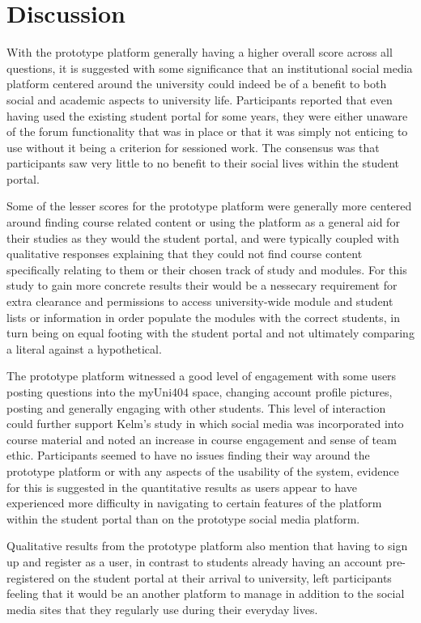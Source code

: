 \documentclass[lettersize,journal]{IEEEtran}
\begin{document}
\section{Discussion}

With the prototype platform generally having a higher overall score across all questions, it is suggested with some significance that an institutional social media platform centered around the university
could indeed be of a benefit to both social and academic aspects to university life. Participants reported that even having used the existing student portal for some years, they were either unaware of the
forum functionality that was in place or that it was simply not enticing to use without it being a criterion for sessioned work. The consensus was that participants saw very little to no benefit
to their social lives within the student portal.

Some of the lesser scores for the prototype platform were generally more centered around finding course related content or using the platform as a general aid for their studies as they would the
student portal, and were typically coupled with qualitative responses explaining that they could not find course content specifically relating to them or their chosen track of study and modules.
For this study to gain more concrete results their would be a nessecary requirement for extra clearance and permissions to access university-wide module and student lists or information in order
populate the modules with the correct students, in turn being on equal footing with the student portal and not ultimately comparing a literal against a hypothetical.

The prototype platform witnessed a good level of engagement with some users posting questions into the myUni404 space, changing account profile pictures, posting and generally engaging with other
students. This level of interaction could further support Kelm's \cite{Kelm2011} study in which social media was incorporated into course material and noted an increase in course engagement and sense of
team ethic. Participants seemed to have no issues finding their way around the prototype platform or with any aspects of the usability of the system, evidence for this is suggested in the quantitative
results as users appear to have experienced more difficulty in navigating to certain features of the platform within the student portal than on the prototype social media platform.

Qualitative results from the prototype platform also mention that having to sign up and register as a user, in contrast to students already having an account pre-registered on the student portal
at their arrival to university, left participants feeling that it would be an another platform to manage in addition to the social media sites that they regularly use during their everyday lives.
\end{document}
